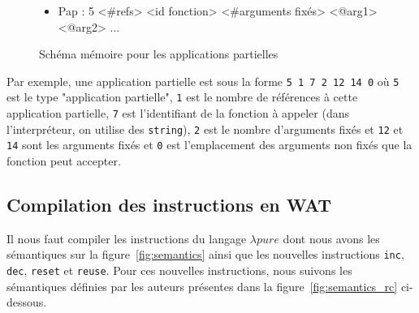 \documentclass{rapportECL}
\begin{document}
\begin{figure}[H]
	\begin{itemize}
		\item Pap   : 5 <\#refs> <id fonction> <\#arguments fixés> <@arg1> <@arg2> ...
	\end{itemize}
	\caption{Schéma mémoire pour les applications partielles}
	\label{listing:memory_wasm_pap}
\end{figure}

Par exemple, une application partielle est sous la forme \verb|5 1 7 2 12 14 0| où \verb|5| est le type "application partielle", 
\verb|1| est le nombre de références à cette application partielle, 
\verb|7| est l'identifiant de la fonction à appeler (dans l'interpréteur, on utilise des \verb|string|), 
\verb|2| est le nombre d'arguments fixés et \verb|12| et \verb|14| sont les arguments fixés et
\verb|0| est l'emplacement des arguments non fixés que la fonction peut accepter.

\subsection{Compilation des instructions en WAT}

Il nous faut compiler les instructions du langage $\lambda{pure}$ dont nous avons les sémantiques sur la figure~\ref{fig:semantics}
ainsi que les nouvelles instructions \verb|inc|, \verb|dec|, \verb|reset| et \verb|reuse|. Pour ces nouvelles instructions, nous
suivons les sémantiques définies par les auteurs présentes dans la figure~\ref{fig:semantics_rc} ci-dessous.
\end{document}
